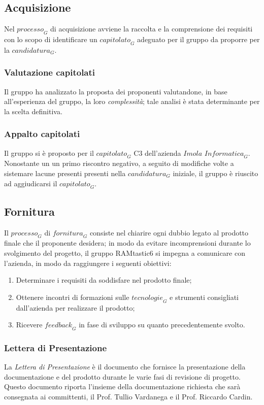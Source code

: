 \subsection{Acquisizione}
Nel $\textit{processo}_G$ di acquisizione avviene la raccolta e la comprensione dei requisiti con lo scopo di identificare un $\textit{capitolato}_G$ adeguato per il gruppo da proporre per la $\textit{candidatura}_G$.
\subsubsection{Valutazione capitolati}
Il gruppo ha analizzato la proposta dei proponenti valutandone, in base all'esperienza del gruppo, la loro \textit{complessità}; tale analisi è stata determinante per la scelta definitiva.
\subsubsection{Appalto capitolati}
Il gruppo si è proposto per il $\textit{capitolato}_G$ C3 dell'azienda $\textit{Imola Informatica}_G$. Nonostante un  un primo riscontro negativo, a seguito di modifiche volte a sistemare lacune presenti  presenti nella $\textit{candidatura}_G$ iniziale, il gruppo è riuscito ad aggiudicarsi il $\textit{capitolato}_G$.

\subsection{Fornitura}
Il $\textit{processo}_G$ di $\textit{fornitura}_G$ consiste nel chiarire ogni dubbio legato al prodotto finale che il proponente desidera; in modo da evitare incomprensioni durante lo svolgimento del progetto, il gruppo RAMtastic6 si impegna a comunicare con l'azienda, in modo da raggiungere i seguenti obiettivi:
\begin{enumerate}
    \item Determinare i requisiti da soddisfare nel prodotto finale;
    \item Ottenere incontri di formazioni sulle $\textit{tecnologie}_G$ e strumenti consigliati dall'azienda per realizzare il prodotto;
    \item Ricevere $\textit{feedback}_G$ in fase di sviluppo su quanto precedentemente svolto.
\end{enumerate}

\subsubsection{Lettera di Presentazione}
La \textit{Lettera di Presentazione} è il documento che fornisce la presentazione della documentazione e del prodotto durante le varie fasi di revisione di progetto. 
\\
Questo documento riporta l’insieme della documentazione richiesta che sarà consegnata ai committenti, il Prof. Tullio Vardanega e il Prof. Riccardo Cardin.

